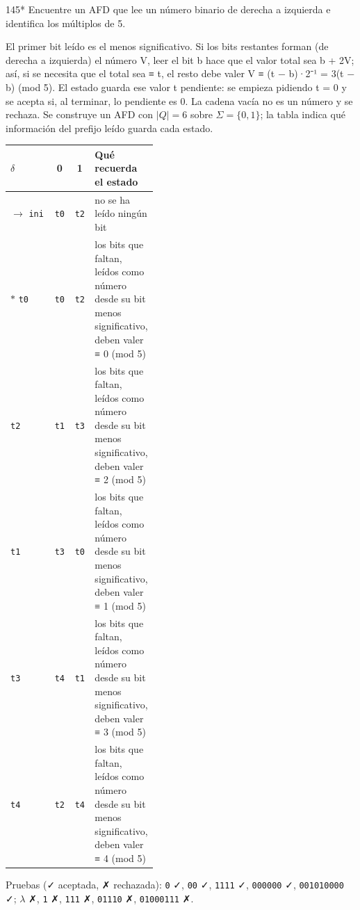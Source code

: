 \documentclass[11pt]{article}
\begin{document}
\begin{ejercicio}{145}{*}
Encuentre un AFD que lee un número binario de derecha a izquierda e identifica los múltiplos de 5.
\end{ejercicio}
\proc El primer bit leído es el menos significativo. Si los bits restantes forman (de derecha a izquierda) el número V, leer el bit b hace que el valor total sea b + 2V; así, si se necesita que el total sea ≡ t, el resto debe valer V ≡ (t − b)·2⁻¹ = 3(t − b) (mod 5). El estado guarda ese valor t pendiente: se empieza pidiendo t = 0 y se acepta si, al terminar, lo pendiente es 0. La cadena vacía no es un número y se rechaza. Se construye un AFD con $|Q| = 6$ sobre $\Sigma = \{0, 1\}$; la tabla indica qué información del prefijo leído guarda cada estado.
\begin{center}\small\begin{tabular}{lccp{0.42\linewidth}}\toprule
$\delta$ & 0 & 1 & Qué recuerda el estado \\\midrule
$\to$ \texttt{ini} & \texttt{t0} & \texttt{t2} & no se ha leído ningún bit \\
$*$ \texttt{t0} & \texttt{t0} & \texttt{t2} & los bits que faltan, leídos como número desde su bit menos significativo, deben valer ≡ 0 (mod 5) \\
 \texttt{t2} & \texttt{t1} & \texttt{t3} & los bits que faltan, leídos como número desde su bit menos significativo, deben valer ≡ 2 (mod 5) \\
 \texttt{t1} & \texttt{t3} & \texttt{t0} & los bits que faltan, leídos como número desde su bit menos significativo, deben valer ≡ 1 (mod 5) \\
 \texttt{t3} & \texttt{t4} & \texttt{t1} & los bits que faltan, leídos como número desde su bit menos significativo, deben valer ≡ 3 (mod 5) \\
 \texttt{t4} & \texttt{t2} & \texttt{t4} & los bits que faltan, leídos como número desde su bit menos significativo, deben valer ≡ 4 (mod 5) \\
\bottomrule\end{tabular}\end{center}
Pruebas (✓ aceptada, ✗ rechazada): \texttt{0} ✓, \texttt{00} ✓, \texttt{1111} ✓, \texttt{000000} ✓, \texttt{001010000} ✓; $\lambda$ ✗, \texttt{1} ✗, \texttt{111} ✗, \texttt{01110} ✗, \texttt{01000111} ✗.
\end{document}
